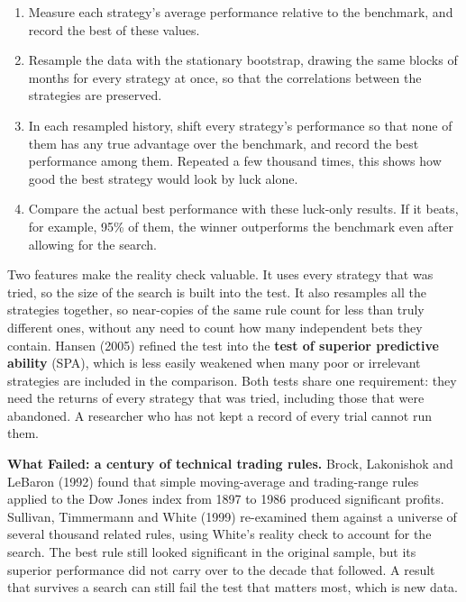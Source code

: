 \begin{enumerate}
  \item Measure each strategy's average performance relative to the benchmark, and record the best of these values.
  \item Resample the data with the stationary bootstrap, drawing the same blocks of months for every strategy at once, so that the correlations between the strategies are preserved.
  \item In each resampled history, shift every strategy's performance so that none of them has any true advantage over the benchmark, and record the best performance among them. Repeated a few thousand times, this shows how good the best strategy would look by luck alone.
  \item Compare the actual best performance with these luck-only results. If it beats, for example, 95\% of them, the winner outperforms the benchmark even after allowing for the search.
\end{enumerate}

Two features make the reality check valuable. It uses every strategy that was tried, so the size of the search is built into the test. It also resamples all the strategies together, so near-copies of the same rule count for less than truly different ones, without any need to count how many independent bets they contain. Hansen (2005) refined the test into the \textbf{test of superior predictive ability} (SPA), which is less easily weakened when many poor or irrelevant strategies are included in the comparison. Both tests share one requirement: they need the returns of every strategy that was tried, including those that were abandoned. A researcher who has not kept a record of every trial cannot run them.

\begin{callout}
\textbf{What Failed: a century of technical trading rules.} Brock, Lakonishok and LeBaron (1992) found that simple moving-average and trading-range rules applied to the Dow Jones index from 1897 to 1986 produced significant profits. Sullivan, Timmermann and White (1999) re-examined them against a universe of several thousand related rules, using White's reality check to account for the search. The best rule still looked significant in the original sample, but its superior performance did not carry over to the decade that followed. A result that survives a search can still fail the test that matters most, which is new data.
\end{callout}

